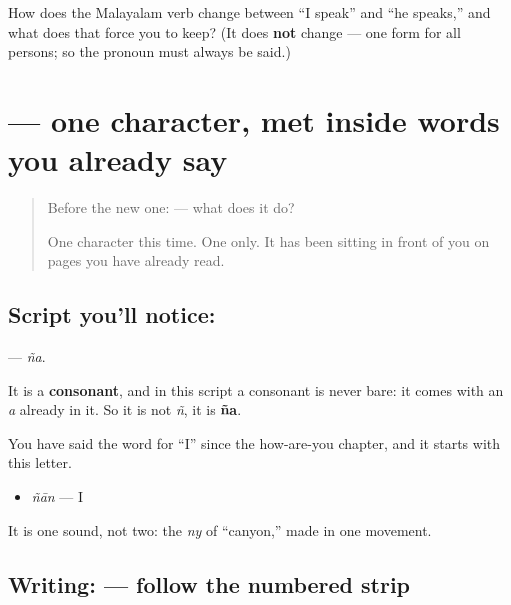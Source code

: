 \begin{tcolorbox}[breakable,colback=teal!4,colframe=teal!35!black,title={Before you move on}]
How does the Malayalam verb change between \textquotedblleft{}I speak\textquotedblright{} and \textquotedblleft{}he speaks,\textquotedblright{} and what does that force you to keep? (It does \textbf{not} change — one form for all persons; so the pronoun must always be said.)
\end{tcolorbox}
\section[\texorpdfstring{\ml{ഞ} (ña)}{ഞ (ña)}]{ — one character, met inside words you already say}

\label{lesson:ML-S115-letter-nya}



\begin{quote}
Before the new one:  — what does it do?

One character this time. One only. It has been sitting in front of you on pages you have already read.
\end{quote}

\subsection*{Script you'll notice: }
\textbf{} — \emph{ña}.

It is a \textbf{consonant}, and in this script a consonant is never bare: it comes with an \emph{a} already in it. So it is not \emph{ñ}, it is \textbf{ña}.

You have said the word for \textquotedblleft{}I\textquotedblright{} since the how-are-you chapter, and it starts with this letter.

\begin{itemize}
\raggedright
  \item \textbf{} \emph{ñān} — I
\end{itemize}

It is one sound, not two: the \emph{ny} of \textquotedblleft{}canyon,\textquotedblright{} made in one movement.

\subsection*{Writing:  — follow the numbered strip}

